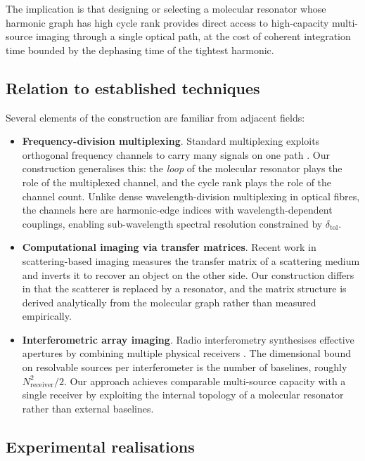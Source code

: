 \documentclass[11pt,twocolumn,a4paper]{article}
\theoremstyle{definition}
\theoremstyle{remark}
\begin{document}
The implication is that designing or selecting a molecular resonator whose harmonic graph has high cycle rank provides direct access to high-capacity multi-source imaging through a single optical path, at the cost of coherent integration time bounded by the dephasing time of the tightest harmonic.

\subsection{Relation to established techniques}

Several elements of the construction are familiar from adjacent fields:

\begin{itemize}[nosep]
\item \textbf{Frequency-division multiplexing}. Standard multiplexing exploits orthogonal frequency channels to carry many signals on one path \citep{agrawal2002}. Our construction generalises this: the \emph{loop} of the molecular resonator plays the role of the multiplexed channel, and the cycle rank plays the role of the channel count. Unlike dense wavelength-division multiplexing in optical fibres, the channels here are harmonic-edge indices with wavelength-dependent couplings, enabling sub-wavelength spectral resolution constrained by $\delta_{\mathrm{tol}}$.
\item \textbf{Computational imaging via transfer matrices}. Recent work in scattering-based imaging \citep{popoff2010,choi2011} measures the transfer matrix of a scattering medium and inverts it to recover an object on the other side. Our construction differs in that the scatterer is replaced by a resonator, and the matrix structure is derived analytically from the molecular graph rather than measured empirically.
\item \textbf{Interferometric array imaging}. Radio interferometry synthesises effective apertures by combining multiple physical receivers \citep{thompson2017}. The dimensional bound on resolvable sources per interferometer is the number of baselines, roughly $N_{\mathrm{receiver}}^2/2$. Our approach achieves comparable multi-source capacity with a single receiver by exploiting the internal topology of a molecular resonator rather than external baselines.
\end{itemize}

\subsection{Experimental realisations}
\end{document}
